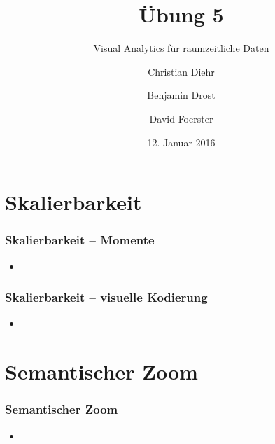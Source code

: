 \documentclass{beamer}
\title{Übung 5}
\subtitle{Visual Analytics für raumzeitliche Daten}
\author{Christian Diehr \and Benjamin Drost \and David Foerster}
\institute{Institut für Informatik\\Humboldt-Universität zu Berlin}
\date{12. Januar 2016}
\begin{document}
    \begin{frame}
        \titlepage
    \end{frame}
    \logo %
        
    \section{Skalierbarkeit}
    \begin{frame}
			\frametitle{Skalierbarkeit -- Momente}
			\begin{itemize}
				\setlength\itemsep{1em}
				\item 
			\end{itemize}
    \end{frame}
    
    \begin{frame}
			\frametitle{Skalierbarkeit -- visuelle Kodierung}
			\begin{itemize}
				\setlength\itemsep{1em}
				\item 
			\end{itemize}
    \end{frame}
    
    \section{Semantischer Zoom}
    \begin{frame}
			\frametitle{Semantischer Zoom}
			\begin{itemize}
				\setlength\itemsep{1em}
				\item 
			\end{itemize}
    \end{frame}
\end{document}
